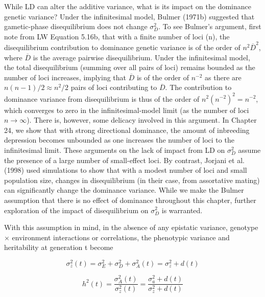 \documentclass{article}
\begin{document}
While LD can alter the additive variance, what is its impact on the dominance genetic variance? Under the infinitesimal model, Bulmer (1971b) suggested that gametic-phase disequilibrium does not change  $ \sigma_D^2 $. To see Bulmer's argument, first note from LW Equation 5.16b, that with a finite number of loci (n), the disequilibrium contribution to dominance genetic variance is of the order of  $ n^2 \overline{D}^2 $, where  $ \overline{D} $ is the average pairwise disequilibrium. Under the infinitesimal model, the total disequilibrium (summing over all pairs of loci) remains bounded as the number of loci increases, implying that  $ \overline{D} $ is of the order of  $ n^{-2} $ as there are  $ n(n-1)/2 \approx n^2/2 $ pairs of loci contributing to  $ \overline{D} $. The contribution to dominance variance from disequilibrium is thus of the order of  $ n^2(n^{-2})^2 = n^{-2} $, which converges to zero in the infinitesimal-model limit (as the number of loci  $ n \to \infty $). There is, however, some delicacy involved in this argument. In Chapter 24, we show that with strong directional dominance, the amount of inbreeding depression becomes unbounded as one increases the number of loci to the infinitesimal limit. These arguments on the lack of impact from LD on  $ \sigma_D^2 $ assume the presence of a large number of small-effect loci. By contrast, Jorjani et al. (1998) used simulations to show that with a modest number of loci and small population size, changes in disequilibrium (in their case, from assortative mating) can significantly change the dominance variance. While we make the Bulmer assumption that there is no effect of dominance throughout this chapter, further exploration of the impact of disequilibrium on  $ \sigma_D^2 $ is warranted.

With this assumption in mind, in the absence of any epistatic variance, genotype  $ \times $ environment interactions or correlations, the phenotypic variance and heritability at generation t become

\begin{equation}
\sigma_{z}^{2}(t)=\sigma_{E}^{2}+\sigma_{D}^{2}+\sigma_{A}^{2}(t)=\sigma_{z}^{2}+d(t)
\tag{16.4a}
\label{eq:16_4a}
\end{equation}

\begin{equation}
h^{2}(t)=\frac{\sigma_{A}^{2}(t)}{\sigma_{z}^{2}(t)}=\frac{\sigma_{a}^{2}+d(t)}{\sigma_{z}^{2}+d(t)}
\tag{16.4b}
\label{eq:16_4b}
\end{equation}
\end{document}
